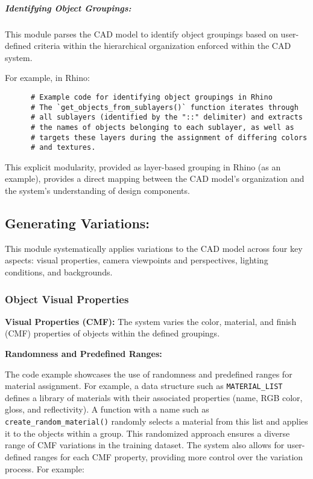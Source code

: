 \documentclass{article}
\begin{document}
\subparagraph{Identifying Object Groupings:} This module parses the CAD model to identify object groupings based on user-defined criteria within the hierarchical organization enforced within the CAD system.

For example, in Rhino:

    \begin{verbatim}
      # Example code for identifying object groupings in Rhino
      # The `get_objects_from_sublayers()` function iterates through 
      # all sublayers (identified by the "::" delimiter) and extracts 
      # the names of objects belonging to each sublayer, as well as 
      # targets these layers during the assignment of differing colors
      # and textures.
    \end{verbatim}  

This explicit modularity, provided as layer-based grouping in Rhino (as an example), provides a direct mapping between the CAD model's organization and the system's understanding of design components.

\subsection{Generating Variations:} This module systematically applies variations to the CAD model across four key aspects: visual properties, camera viewpoints and perspectives, lighting conditions, and backgrounds.

\subsubsection{Object Visual Properties}

\textbf{Visual Properties (CMF):} The system varies the color, material, and finish (CMF) properties of objects within the defined groupings.

\textbf{Randomness and Predefined Ranges:}

The code example showcases the use of randomness and predefined ranges for material assignment. For example, a data structure such as \texttt{MATERIAL\_LIST} defines a library of materials with their associated properties (name, RGB color, gloss, and reflectivity). A function with a name such as \texttt{create\_random\_material()} randomly selects a material from this list and applies it to the objects within a group. This randomized approach ensures a diverse range of CMF variations in the training dataset. The system also allows for user-defined ranges for each CMF property, providing more control over the variation process. For example:
\end{document}
